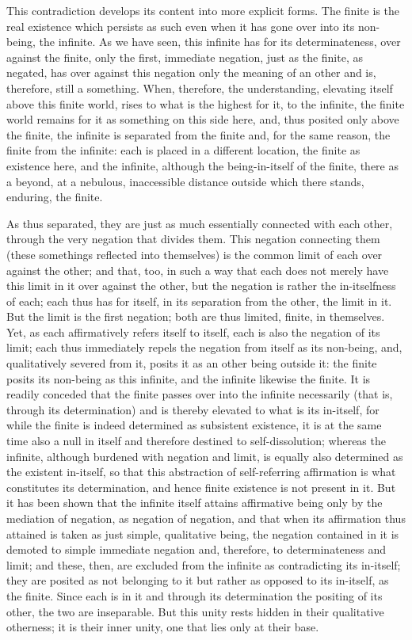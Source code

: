 This contradiction develops its content into more explicit forms.
The finite is the real existence which persists as such
even when it has gone over into its non-being, the infinite.
As we have seen, this infinite has for its determinateness,
over against the finite,
only the first, immediate negation,
just as the finite, as negated,
has over against this negation
only the meaning of an other
and is, therefore, still a something.
When, therefore, the understanding,
elevating itself above this finite world,
rises to what is the highest for it,
to the infinite,
the finite world remains for it
as something on this side here,
and, thus posited only above the finite,
the infinite is separated from the finite
and, for the same reason,
the finite from the infinite:
each is placed in a different location,
the finite as existence here,
and the infinite, although the being-in-itself of the finite,
there as a beyond, at a nebulous, inaccessible distance
outside which there stands, enduring, the finite.

As thus separated, they are just as much
essentially connected with each other,
through the very negation that divides them.
This negation connecting them
(these somethings reflected into themselves)
is the common limit of each over against the other;
and that, too, in such a way that each
does not merely have this limit in it over against the other,
but the negation is rather the in-itselfness of each;
each thus has for itself, in its separation
from the other, the limit in it.
But the limit is the first negation;
both are thus limited, finite, in themselves.
Yet, as each affirmatively refers itself to itself,
each is also the negation of its limit;
each thus immediately repels
the negation from itself as its non-being,
and, qualitatively severed from it,
posits it as an other being outside it:
the finite posits its non-being as this infinite,
and the infinite likewise the finite.
It is readily conceded that the
finite passes over into the infinite necessarily
(that is, through its determination)
and is thereby elevated to what is its in-itself,
for while the finite is indeed determined as subsistent existence,
it is at the same time also a null in itself
and therefore destined to self-dissolution;
whereas the infinite, although burdened with negation and limit,
is equally also determined as the existent in-itself,
so that this abstraction of self-referring affirmation is
what constitutes its determination,
and hence finite existence is not present in it.
But it has been shown that the infinite itself
attains affirmative being only by the mediation of negation,
as negation of negation,
and that when its affirmation thus attained is
taken as just simple, qualitative being,
the negation contained in it is demoted
to simple immediate negation
and, therefore, to determinateness and limit;
and these, then, are excluded from the infinite
as contradicting its in-itself;
they are posited as not belonging to it
but rather as opposed to its in-itself,
as the finite.
Since each is in it and through its determination
the positing of its other, the two are inseparable.
But this unity rests hidden in their qualitative otherness;
it is their inner unity, one that lies only at their base.


